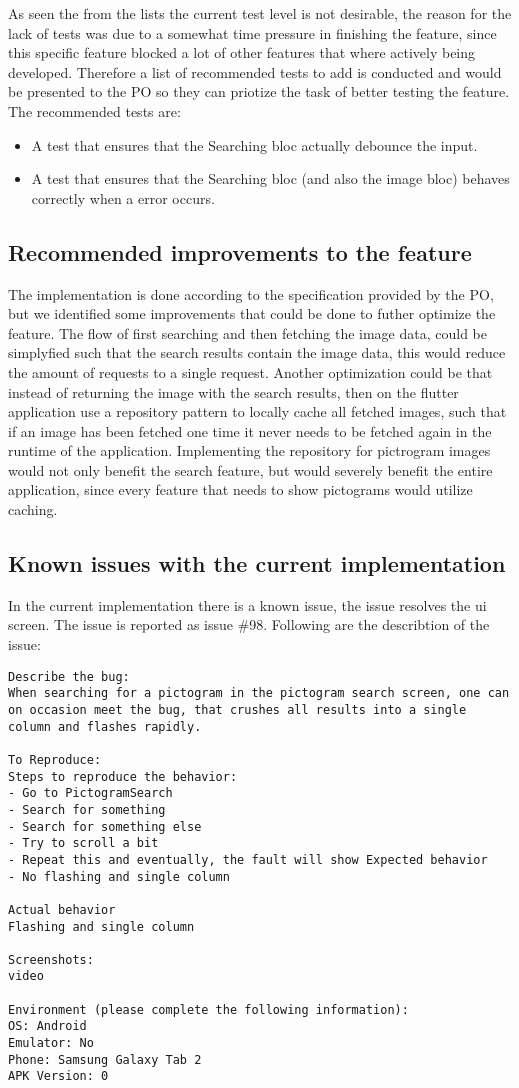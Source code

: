 As seen the from the lists the current test level is not desirable, the reason for the lack of tests was due to a somewhat time pressure in finishing the feature, since this specific feature blocked a lot of other features that where actively being developed. Therefore a list of recommended tests to add is conducted and would be presented to the \gls{PO} so they can priotize the task of better testing the feature. The recommended tests are:

\begin{itemize}
  \item A test that ensures that the Searching \gls{bloc} actually debounce the input.
  \item A test that ensures that the Searching \gls{bloc} (and also the image \gls{bloc}) behaves correctly when a error occurs.
\end{itemize}

\subsection{Recommended improvements to the feature}
The implementation is done according to the specification provided by the \gls{PO}, but we identified some improvements that could be done to futher optimize the feature. The flow of first searching and then fetching the image data, could be simplyfied such that the search results contain the image data, this would reduce the amount of requests to a single request. Another optimization could be that instead of returning the image with the search results, then on the flutter application use a repository pattern to locally cache all fetched images, such that if an image has been fetched one time it never needs to be fetched again in the runtime of the application. Implementing the repository for pictrogram images would not only benefit the search feature, but would severely benefit the entire application, since every feature that needs to show pictograms would utilize caching.

\subsection{Known issues with the current implementation}
In the current implementation there is a known issue, the issue resolves the \gls{ui} screen. The issue is reported as issue \#98. Following are the describtion of the issue:
\begin{lstlisting}
Describe the bug:
When searching for a pictogram in the pictogram search screen, one can on occasion meet the bug, that crushes all results into a single column and flashes rapidly.

To Reproduce:
Steps to reproduce the behavior:
- Go to PictogramSearch
- Search for something
- Search for something else
- Try to scroll a bit
- Repeat this and eventually, the fault will show Expected behavior
- No flashing and single column

Actual behavior
Flashing and single column

Screenshots:
video

Environment (please complete the following information):
OS: Android
Emulator: No
Phone: Samsung Galaxy Tab 2
APK Version: 0
\end{lstlisting}
